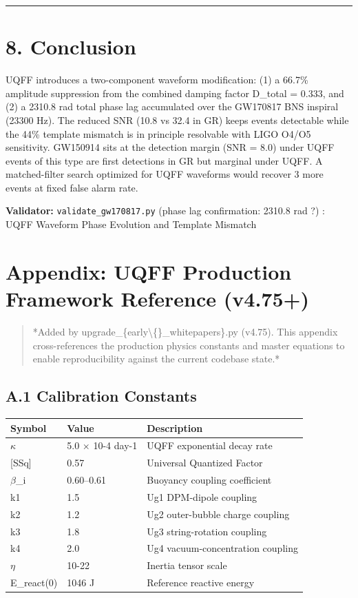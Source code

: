 \documentclass[11pt]{article}
\begin{document}
\noindent\rule{\textwidth}{0.4pt}

\section*{8. Conclusion}

UQFF introduces a two-component waveform modification: (1) a 66.7\% amplitude suppression from the combined damping factor D\_total = 0.333, and (2) a 2310.8 rad total phase lag accumulated over the GW170817 BNS inspiral (23300 Hz). The reduced SNR (10.8 vs 32.4 in GR) keeps events detectable while the 44\% template mismatch is in principle resolvable with LIGO O4/O5 sensitivity. GW150914 sits at the detection margin (SNR = 8.0) under UQFF  events of this type are first detections in GR but marginal under UQFF. A matched-filter search optimized for UQFF waveforms would recover 3 more events at fixed false alarm rate.

\textbf{Validator:} \verb|validate_gw170817.py| (phase lag confirmation: 2310.8 rad ?) : UQFF Waveform Phase Evolution and Template Mismatch

\section*{Appendix: UQFF Production Framework Reference (v4.75+)}

\begin{quote}
*Added by upgrade\_\{early\textbackslash\{\}\_whitepapers\}.py (v4.75). This appendix cross-references
the production physics constants and master equations to enable reproducibility
against the current codebase state.*
\end{quote}

\subsection*{A.1 Calibration Constants}

\begin{center}
\begin{longtable}{lll}
\toprule
Symbol & Value & Description \tabularnewline
\midrule
\endhead
$\kappa$ & 5.0 $\times$ 10-4 day-1 & UQFF exponential decay rate \tabularnewline
{}[SSq] & 0.57 & Universal Quantized Factor \tabularnewline
$\beta$\_i & 0.60--0.61 & Buoyancy coupling coefficient \tabularnewline
k1 & 1.5 & Ug1 DPM-dipole coupling \tabularnewline
k2 & 1.2 & Ug2 outer-bubble charge coupling \tabularnewline
k3 & 1.8 & Ug3 string-rotation coupling \tabularnewline
k4 & 2.0 & Ug4 vacuum-concentration coupling \tabularnewline
$\eta$ & 10-22 & Inertia tensor scale \tabularnewline
E\_react(0) & 1046 J & Reference reactive energy \tabularnewline
\bottomrule
\end{longtable}
\end{center}
\end{document}
